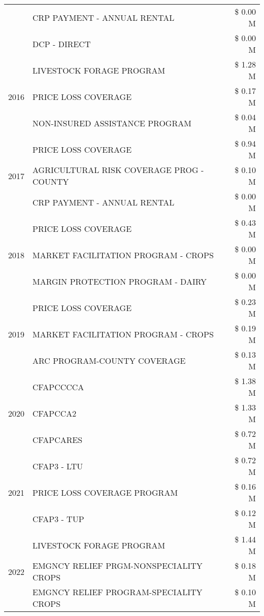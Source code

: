 \begin{tabular}{llr}
 & CRP PAYMENT - ANNUAL RENTAL & \$ 0.00 M \\
 & DCP - DIRECT & \$ 0.00 M \\
\cline{1-3}
\multirow[t]{3}{*}{2016} & LIVESTOCK FORAGE PROGRAM & \$ 1.28 M \\
 & PRICE LOSS COVERAGE & \$ 0.17 M \\
 & NON-INSURED ASSISTANCE PROGRAM & \$ 0.04 M \\
\cline{1-3}
\multirow[t]{3}{*}{2017} & PRICE LOSS COVERAGE & \$ 0.94 M \\
 & AGRICULTURAL RISK COVERAGE PROG - COUNTY & \$ 0.10 M \\
 & CRP PAYMENT - ANNUAL RENTAL & \$ 0.00 M \\
\cline{1-3}
\multirow[t]{3}{*}{2018} & PRICE LOSS COVERAGE & \$ 0.43 M \\
 & MARKET FACILITATION PROGRAM - CROPS & \$ 0.00 M \\
 & MARGIN PROTECTION PROGRAM - DAIRY & \$ 0.00 M \\
\cline{1-3}
\multirow[t]{3}{*}{2019} & PRICE LOSS COVERAGE & \$ 0.23 M \\
 & MARKET FACILITATION PROGRAM - CROPS & \$ 0.19 M \\
 & ARC PROGRAM-COUNTY COVERAGE & \$ 0.13 M \\
\cline{1-3}
\multirow[t]{3}{*}{2020} & CFAPCCCCA & \$ 1.38 M \\
 & CFAPCCA2 & \$ 1.33 M \\
 & CFAPCARES & \$ 0.72 M \\
\cline{1-3}
\multirow[t]{3}{*}{2021} & CFAP3 - LTU & \$ 0.72 M \\
 & PRICE LOSS COVERAGE PROGRAM & \$ 0.16 M \\
 & CFAP3 - TUP & \$ 0.12 M \\
\cline{1-3}
\multirow[t]{3}{*}{2022} & LIVESTOCK FORAGE PROGRAM & \$ 1.44 M \\
 & EMGNCY RELIEF PRGM-NONSPECIALITY CROPS & \$ 0.18 M \\
 & EMGNCY RELIEF PROGRAM-SPECIALITY CROPS & \$ 0.10 M \\
\cline{1-3}
\bottomrule
\end{tabular}
